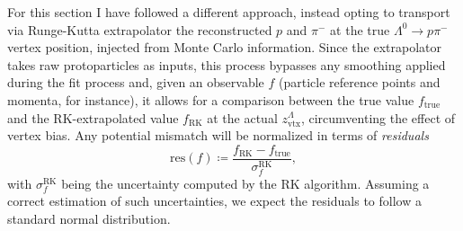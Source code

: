 For this section I have followed a different approach, instead opting to transport via Runge-Kutta extrapolator the reconstructed $p$ and $\pi^-$ at the true  $\Lambda^0 \rightarrow p\pi^-$ vertex position, injected from Monte Carlo information.
Since the extrapolator takes raw protoparticles as inputs, this process bypasses any smoothing applied during the fit process and, given an observable $f$ (particle reference points and momenta, for instance), it allows for a comparison between the true value $f_\text{true}$ and the RK-extrapolated value $f_\text{RK}$ at the actual $z_\text{vtx}^\Lambda$, circumventing the effect of vertex bias.
Any potential mismatch will be normalized in terms of \textit{residuals}
\begin{equation}
	\text{res}(f) \coloneqq \frac{f_\text{RK} - f_\text{true}}{\sigma_f^\text{RK}},
\end{equation}
with $\sigma_f^\text{RK}$ being the uncertainty computed by the RK algorithm.
Assuming a correct estimation of such uncertainties, we expect the residuals to follow a standard normal distribution.

